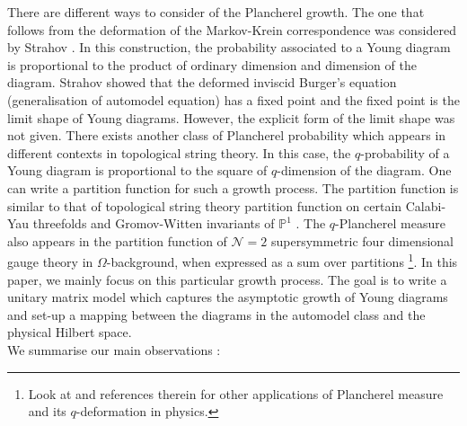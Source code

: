 \documentclass[3p,12pt]{elsarticle}
\numberwithin{equation}{section}
\begin{document}
There are different ways to consider \qdf of the Plancherel growth. The one that follows from the deformation of the Markov-Krein correspondence was considered by Strahov \cite{Strahov07}. In this construction, the probability associated to a Young diagram is proportional to the product of ordinary dimension and \qq dimension of the diagram. Strahov \cite{Strahov07} showed that the deformed inviscid Burger's equation (generalisation of automodel equation) has a fixed point and the fixed point is the \qd limit shape of Young diagrams. However, the explicit form of the limit shape was not given. There exists another class of \qd Plancherel probability which appears in different contexts in topological string theory. In this case, the $q$-probability of a Young diagram is proportional to the square of $q$-dimension of the diagram. One can write a partition function for such a growth process. The partition function is similar to that of topological string theory partition function on certain Calabi-Yau threefolds \cite{Caporaso:2006gk, Nekrasov:2003rj, Nekrasov:2002qd, Marino:2006hs} and Gromov-Witten invariants of $\mathbb{P}^1$ \cite{Eynard:2008mt, okounkov2006uses}. The $q$-Plancherel measure also appears in the partition function of $\mathcal{N}=2$ supersymmetric four dimensional gauge theory in $\Omega$-background, when expressed as a sum over partitions \cite{Nekrasov:2003rj}\footnote{Look at \cite{okounkov2006uses} and references therein for other applications of Plancherel measure and its $q$-deformation in physics.}. In this paper, we mainly focus on this particular growth process. The goal is to write a unitary matrix model which captures the \qd asymptotic growth of Young diagrams and set-up a mapping between the diagrams in the automodel class and the physical Hilbert space.\\
We summarise our main observations : 
\end{document}
